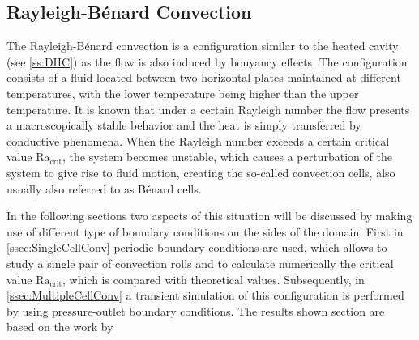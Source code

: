 \subsection{Rayleigh-Bénard Convection}\label{ssec:RayBer}

The Rayleigh-Bénard convection is a configuration similar to the heated cavity (see \cref{ss:DHC}) as the flow is also induced by bouyancy effects. The configuration consists of a fluid located between two horizontal plates maintained at different temperatures, with the lower temperature being higher than the upper temperature. It is known that under a certain Rayleigh number the flow presents a macroscopically stable behavior and the heat is simply transferred by conductive phenomena. When the Rayleigh number exceeds a certain critical value $\text{Ra}_{\text{crit}}$, the system becomes unstable, which causes a perturbation of the system to give rise to fluid motion, creating the so-called convection cells, also usually also referred to as Bénard cells.

In the following sections two aspects of this situation will be discussed by making use of different type of boundary conditions on the sides of the domain. First in \cref{ssec:SingleCellConv} periodic boundary conditions are used, which allows to study a single pair of convection rolls and to calculate numerically the critical value $\text{Ra}_{\text{crit}}$, which is compared with theoretical values. Subsequently, in \cref{ssec:MultipleCellConv} a transient simulation of this configuration is performed by using pressure-outlet boundary conditions. The results shown section are based on the work by \textcite{miaoHighOrderSimulationLowMachFlows2022} %

